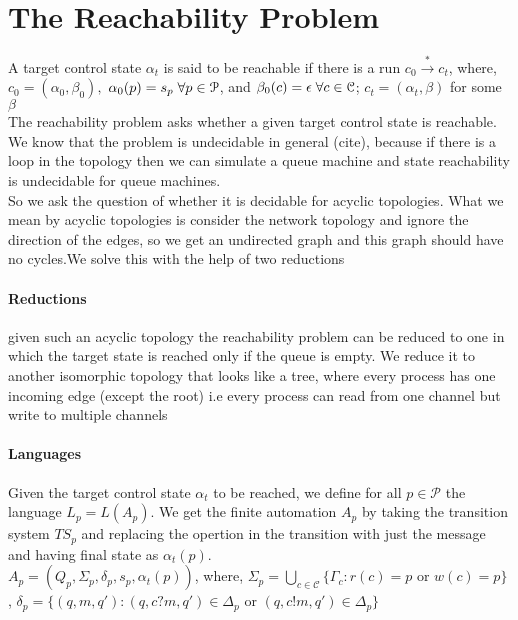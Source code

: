 \documentclass[a4paper,UKenglish,cleveref, autoref, thm-restate]{lipics-v2019}
\begin{document}
\section{The Reachability Problem}
\hspace*{1cm} A target control state $\alpha_t$ is said to be reachable if there is a run $c_0 \xrightarrow{*} c_t$, where, $c_0 = (\alpha_0, \beta_0),$  $\alpha_0(p)= s_p \hspace{1mm}\forall p \in \mathcal{P}$, and $\beta_0(c) = \epsilon \hspace{1mm} \forall c \in \mathcal{C}$; $c_t = (\alpha_t, \beta)$ for some $\beta$ \\
\hspace*{1cm}The reachability problem asks whether a given target control state is reachable. We know that the problem is undecidable in general (cite), because if there is a loop in the topology then we can simulate a queue machine and state reachability is undecidable for queue machines. \\
\hspace*{1cm}So we ask the question of whether it is decidable for acyclic topologies.
What we mean by acyclic topologies is consider the network topology and ignore the direction of the edges, so we get an undirected graph and this graph should have no cycles.We solve this with the help of two reductions

\paragraph*{Reductions}

\hspace*{1cm}given such an acyclic topology the reachability problem can be reduced to one in which the target state is reached only if the queue is empty.
We reduce it to another isomorphic topology that looks like a tree, where every process has one incoming edge (except the root) i.e every process can read from one channel but write to multiple channels \cite{CQS}



\paragraph*{Languages}

\hspace*{1cm}Given the target control state $\alpha_t$  to be reached, we define for all $p \in \mathcal{P}$ the language $L_p = L(A_p)$. We get the finite automation $A_p$ by taking the transition system $TS_p$ and replacing the opertion in the transition with just the message and having final state as $\alpha_t(p)$. \\
\hspace{5cm} $A_p= (Q_p, \Sigma_p, \delta_p, s_p, \alpha_t(p))$, 
where, $\Sigma_p = \bigcup\limits_{c \in \mathcal{C}} \{ \Gamma_c : r(c) = p \text{ or } w(c) = p\}$ , $\delta_p = \{(q, m, q') : (q, c?m, q') \in \Delta_p \text{ or } (q, c!m, q') \in \Delta_p\}$
\end{document}
